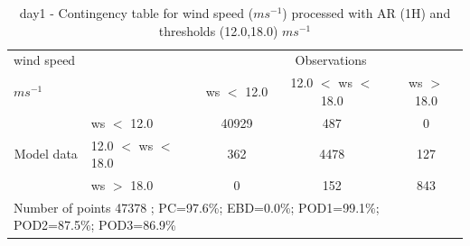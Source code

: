 \begin{table}[h!]
\begin{center}
\begin{tabular}{llccc}
\hline
{wind speed}                                       &                                                    & \multicolumn{3}{c}{Observations}                 \\
{$m s^{-1}$}                                       &                             & ws $<$ 12.0   & 12.0 $<$ ws $<$ 18.0 & ws $>$ 18.0 \\
\hline
\multicolumn{1}{c}{\multirow{3}{*}{Model data}}  & ws $<$ 12.0             & 40929                & 487                       & 0              \\
                                                 & 12.0  $<$ ws $<$ 18.0 & 362                & 4478                       & 127              \\
                                                 & ws $>$ 18.0             & 0                & 152                       & 843              \\
\hline 
\multicolumn{5}{l}{ Number of points        47378 ; PC=97.6\%; EBD=0.0\%; POD1=99.1\%; POD2=87.5\%; POD3=86.9\%}                 \\
\end{tabular}
\end{center}
\caption{day1 - Contingency table for  wind speed ($m s^{-1}$) processed with AR (1H) and thresholds (12.0,18.0) $m s^{-1}$}
\label{tab:contingencywsAFT:day1}
\end{table}
